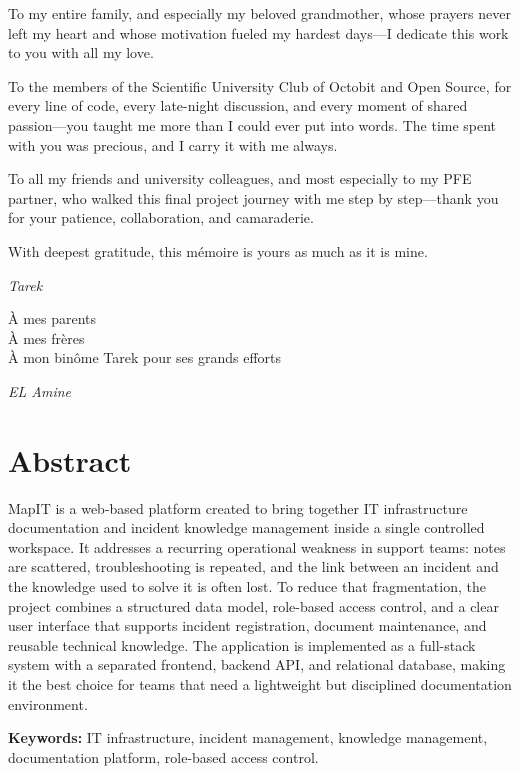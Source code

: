 \documentclass[12pt,a4paper]{report}
\begin{document}
To my entire family, and especially my beloved grandmother, whose prayers never left my heart and whose motivation fueled my hardest days—I dedicate this work to you with all my love.

To the members of the Scientific University Club of Octobit and Open Source, for every line of code, every late-night discussion, and every moment of shared passion—you taught me more than I could ever put into words. The time spent with you was precious, and I carry it with me always.

To all my friends and university colleagues, and most especially to my PFE partner, who walked this final project journey with me step by step—thank you for your patience, collaboration, and camaraderie.

With deepest gratitude, this mémoire is yours as much as it is mine.


\vspace{1.5cm}
\hfill \textit{Tarek}

\clearpage

À mes parents \\
À mes frères \\
À mon binôme Tarek pour ses grands efforts

\vspace{0.5cm}
\hfill \textit{EL Amine}

\clearpage

\chapter*{Abstract}
MapIT is a web-based platform created to bring together IT infrastructure documentation and incident knowledge management inside a single controlled workspace. It addresses a recurring operational weakness in support teams: notes are scattered, troubleshooting is repeated, and the link between an incident and the knowledge used to solve it is often lost. To reduce that fragmentation, the project combines a structured data model, role-based access control, and a clear user interface that supports incident registration, document maintenance, and reusable technical knowledge. The application is implemented as a full-stack system with a separated frontend, backend API, and relational database, making it the best choice for teams that need a lightweight but disciplined documentation environment.

\textbf{Keywords:} IT infrastructure, incident management, knowledge management, documentation platform, role-based access control.
\end{document}
